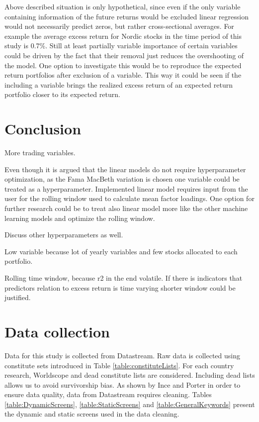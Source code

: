 \documentclass{article}
\begin{document}
Above described situation is only hypothetical, since even if the only variable containing information of the future returns would be excluded linear regression would not necessarily predict zeros, but rather cross-sectional averages. For example the average excess return for Nordic stocks in the time period of this study is 0.7\%. Still at least partially variable importance of certain variables could be driven by the fact that their removal just reduces the overshooting of the model. One option to investigate this would be to reproduce the expected return portfolios after exclusion of a variable. This way it could be seen if the including a variable brings the realized excess return of an expected return portfolio closer to its expected return. \par

\section{Conclusion}\label{Conclusion}

More trading variables.

Even though it is argued that the linear models do not require hyperparameter optimization, as the Fama MacBeth variation is chosen one variable could be treated as a hyperparameter. Implemented linear model requires input from the user for the rolling window used to calculate mean factor loadings. One option for further research could be to treat also linear model more like the other machine learning models and optimize the rolling window.

Discuss other hyperparameters as well.

Low variable because lot of yearly variables and few stocks allocated to each portfolio.

Rolling time window, because r2 in the end volatile. If there is indicators that predictors relation to excess return is time varying shorter window could be justified.

\clearpage

\appendix
\section{Data collection}
\renewcommand{\thefigure}{A.\arabic{figure}}
\setcounter{figure}{0}
\renewcommand{\thetable}{A.\arabic{table}}
\setcounter{table}{0}

Data for this study is collected from Datastream. Raw data is collected using constitute sets introduced in Table \ref{table:constituteLists}. For each country research, Worldscope and dead constitute lists are considered. Including dead lists allows us to avoid survivorship bias. As shown by Ince and Porter \citeyear{Ince2006} in order to ensure data quality, data from Datastream requires cleaning. Tables \ref{table:DynamicScreens}, \ref{table:StaticScreens} and \ref{table:GeneralKeywords} present the dynamic and static screens used in the data cleaning. \par
\end{document}
